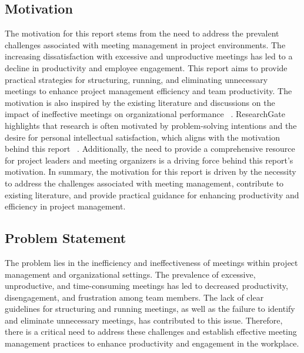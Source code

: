 \documentclass[runningheads]{llncs}
\begin{document}
\subsection{Motivation} 
The motivation for this report stems from the need to address the prevalent challenges associated with meeting management in project environments. The increasing dissatisfaction with excessive and unproductive meetings has led to a decline in productivity and employee engagement. This report aims to provide practical strategies for structuring, running, and eliminating unnecessary meetings to enhance project management efficiency and team productivity.
The motivation is also inspired by the existing literature and discussions on the impact of ineffective meetings on organizational performance ~\cite{ref_article1}. ResearchGate highlights that research is often motivated by problem-solving intentions and the desire for personal intellectual satisfaction, which aligns with the motivation behind this report ~\cite{ref_article1}. Additionally, the need to provide a comprehensive resource for project leaders and meeting organizers is a driving force behind this report's motivation. In summary, the motivation for this report is driven by the necessity to address the challenges associated with meeting management, contribute to existing literature, and provide practical guidance for enhancing productivity and efficiency in project management.
\subsection{Problem Statement}
The problem lies in the inefficiency and ineffectiveness of meetings within project management and organizational settings. The prevalence of excessive, unproductive, and time-consuming meetings has led to decreased productivity, disengagement, and frustration among team members. The lack of clear guidelines for structuring and running meetings, as well as the failure to identify and eliminate unnecessary meetings, has contributed to this issue. Therefore, there is a critical need to address these challenges and establish effective meeting management practices to enhance productivity and engagement in the workplace.
\end{document}
